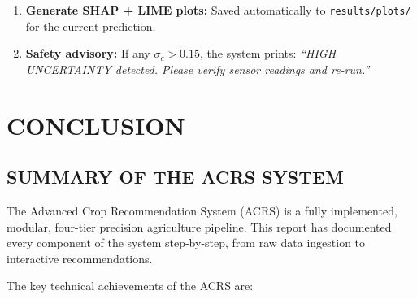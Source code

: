 \documentclass[12pt,a4paper,oneside]{report}
\begin{document}
\begin{enumerate}[leftmargin=*, label=\textbf{Step \arabic*.}]
  \item \textbf{Generate SHAP + LIME plots:} Saved automatically to \texttt{results/plots/} for the current prediction.

  \item \textbf{Safety advisory:} If any $\sigma_c > 0.15$, the system prints: \textit{``HIGH UNCERTAINTY detected. Please verify sensor readings and re-run.''}
\end{enumerate}

\chapter{CONCLUSION}

\section{SUMMARY OF THE ACRS SYSTEM}

The Advanced Crop Recommendation System (ACRS) is a fully implemented, modular, four-tier precision agriculture pipeline. This report has documented every component of the system step-by-step, from raw data ingestion to interactive recommendations.

The key technical achievements of the ACRS are:
\end{document}
